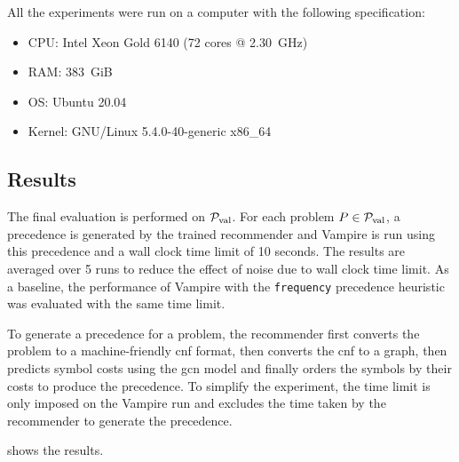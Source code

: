 All the experiments were run on a computer with the following specification:

\begin{itemize}
\item CPU: Intel Xeon Gold 6140 (72 cores @ \SI{2.30}{GHz})
\item RAM: \SI{383}{GiB}
\item OS: Ubuntu 20.04
\item Kernel: GNU/Linux 5.4.0-40-generic x86\_64
\end{itemize}


\subsection{Results}

The final evaluation is performed on $\operatorname{\mathcal{P}_{\mathrm{val}}}$.
For each problem $P \in \operatorname{\mathcal{P}_{\mathrm{val}}}$,
a precedence is generated by the trained recommender
and Vampire is run using this precedence and a wall clock time limit of 10 seconds.
The results are averaged over 5 runs to reduce the effect of noise due to wall clock time limit.
As a baseline, the performance of Vampire with the \texttt{frequency} precedence heuristic was evaluated
with the same time limit.

To generate a precedence for a problem,
the recommender first converts the problem to a machine-friendly \gls{cnf} format,
then converts the \gls{cnf} to a graph,
then predicts symbol costs using the \gls{gcn} model
and finally orders the symbols by their costs to produce the precedence.
To simplify the experiment, the time limit is only imposed on the Vampire run
and excludes the time taken by the recommender to generate the precedence.

 shows the results.

